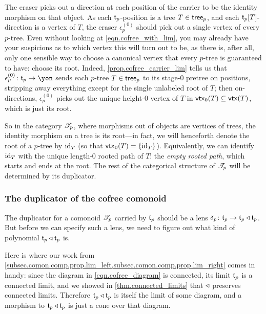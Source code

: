 \documentclass[Book-Poly]{subfiles}
\begin{document}
The eraser picks out a direction at each position of the carrier to be the identity morphism on that object.
As each $\mathfrak{t}_p$-position is a tree $T\in\mathsf{tree}_p$, and each $\mathfrak{t}_p[T]$-direction is a vertex of $T$, the eraser $\epsilon^{(0)}_p$ should pick out a single vertex of every $p$-tree.
Even without looking at \eqref{eqn.cofree_with_lim}, you may already have your suspicions as to which vertex this will turn out to be, as there is, after all, only one sensible way to choose a canonical vertex that every $p$-tree is guaranteed to have: choose its root.
Indeed, \cref{prop.cofree_carrier_lim} tells us that $\epsilon^{(0)}_p\colon\car{t}_p\to\yon$ sends each $p$-tree $T\in\mathsf{tree}_p$ to its stage-$0$ pretree on positions, stripping away everything except for the single unlabeled root of $T$; then on-directions, $\epsilon^{(0)}_p$ picks out the unique height-$0$ vertex of $T$ in $\mathsf{vtx}_0(T)\subseteq\mathsf{vtx}(T)$, which is just its root.

So in the category $\mathscr{T}_{p}$, where morphisms out of objects are vertices of trees, the identity morphism on a tree is its root---in fact, we will henceforth denote the root of a $p$-tree by $\mathrm{id}_T$ (so that $\mathsf{vtx}_0(T)=\{\mathrm{id}_T\}$).
Equivalently, we can identify $\mathrm{id}_T$ with the unique length-$0$ rooted path of $T$: the \emph{empty rooted path}, which starts and ends at the root.
The rest of the categorical structure of $\mathscr{T}_{p}$ will be determined by its duplicator.

\subsubsection{The duplicator of the cofree comonoid}

The duplicator for a comonoid $\mathscr{T}_{p}$ carried by $\mathfrak{t}_p$ should be a lens $\delta_p\colon\mathfrak{t}_p\to\mathfrak{t}_p\mathbin{\triangleleft}\mathfrak{t}_p$.
But before we can specify such a lens, we need to figure out what kind of polynomial $\mathfrak{t}_p\mathbin{\triangleleft}\mathfrak{t}_p$ is.

Here is where our work from \cref{subsec.comon.comp.prop.lim_left,subsec.comon.comp.prop.lim_right} comes in handy: since the diagram in \eqref{eqn.cofree_diagram} is connected, its limit $\mathfrak{t}_p$ is a connected limit, and we showed in \cref{thm.connected_limits} that $\mathbin{\triangleleft}$ preserves connected limits.
Therefore $\mathfrak{t}_p\mathbin{\triangleleft}\mathfrak{t}_p$ is itself the limit of some diagram, and a morphism to $\mathfrak{t}_p\mathbin{\triangleleft}\mathfrak{t}_p$ is just a cone over that diagram.
\end{document}
